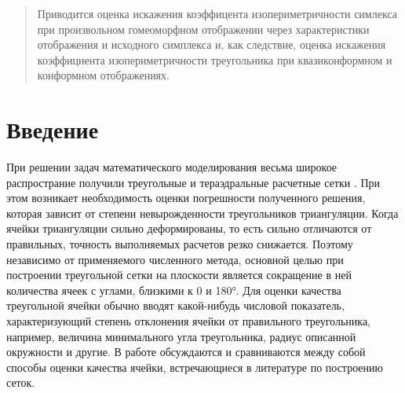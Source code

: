 \documentclass[a4paper,11pt,twoside]{article}
\begin{document}
	
	
	
\maketitle
	
\begin{abstract}
Приводится оценка искажения коэффицента изопериметричности симлекса при произвольном гомеоморфном отображении через характеристики отображения и исходного симплекса и, как следствие, оценка искажения коэффициента изопериметричности треугольника при квазиконформном и конформном отображениях.
\end{abstract}
	
	
\section*{Введение}
При решении задач математического моделирования весьма широкое распространие получили треугольные и тераэдральные расчетные сетки \cite{Shur-VF, Shur-EZhK, Shur-BSO}. При этом возникает необходимость оценки погрешности полученного решения, которая зависит от степени невырожденности треугольников триангуляции. Когда ячейки триангуляции сильно деформированы, то есть сильно отличаются от правильных, точность выполняемых расчетов резко снижается. Поэтому независимо от применяемого численного метода, основной целью при построении треугольной сетки на плоскости является сокращение в ней количества ячеек с углами, близкими к 0 и 180°. Для оценки качества треугольной ячейки обычно вводят какой-нибудь числовой показатель, характеризующий степень отклонения ячейки от правильного треугольника, например, величина минимального угла треугольника, радиус описанной окружности и другие. В работе \cite{Shur-BaPe} обсуждаются и сравниваются между собой способы оценки качества ячейки, встречающиеся в литературе по построению сеток. 
\end{document}
